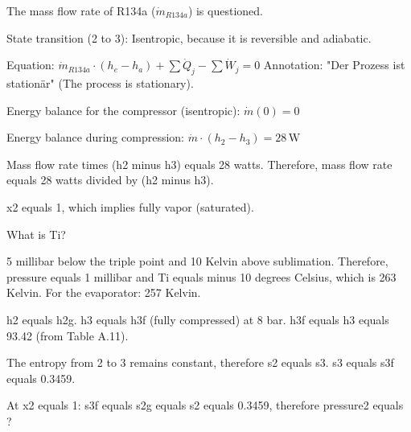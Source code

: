 The mass flow rate of R134a (\( \dot{m}_{R134a} \)) is questioned.  

State transition (2 to 3): Isentropic, because it is reversible and adiabatic.  

Equation:  
\( \dot{m}_{R134a} \cdot (h_e - h_a) + \sum \dot{Q}_j - \sum \dot{W}_j = 0 \)  
Annotation: "Der Prozess ist stationär" (The process is stationary).  

Energy balance for the compressor (isentropic):  
\( \dot{m}(0) = 0 \)  

Energy balance during compression:  
\( \dot{m} \cdot (h_2 - h_3) = 28 \, \text{W} \)

Mass flow rate times (h2 minus h3) equals 28 watts. Therefore, mass flow rate equals 28 watts divided by (h2 minus h3).

x2 equals 1, which implies fully vapor (saturated).

What is Ti?

5 millibar below the triple point and 10 Kelvin above sublimation.  
Therefore, pressure equals 1 millibar and Ti equals minus 10 degrees Celsius, which is 263 Kelvin.  
For the evaporator: 257 Kelvin.

h2 equals h2g.  
h3 equals h3f (fully compressed) at 8 bar.  
h3f equals h3 equals 93.42 (from Table A.11).

The entropy from 2 to 3 remains constant, therefore s2 equals s3.  
s3 equals s3f equals 0.3459.

At x2 equals 1:  
s3f equals s2g equals s2 equals 0.3459, therefore pressure2 equals ?